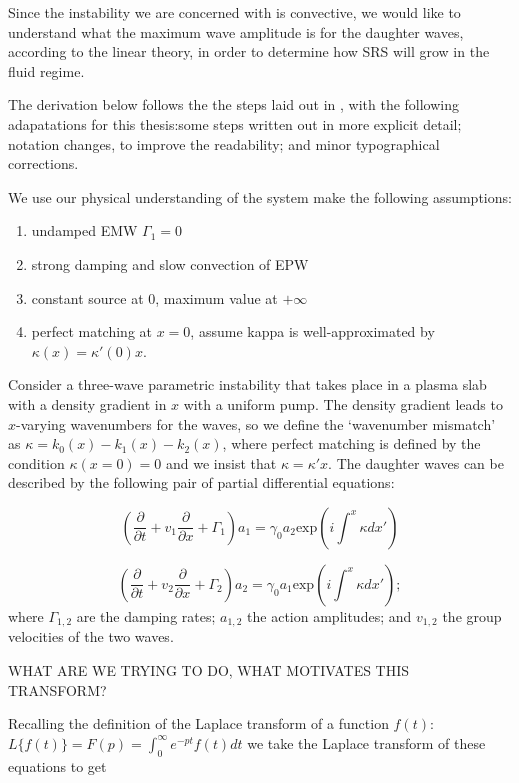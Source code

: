 Since the instability we are concerned with is convective, we would like to understand what the maximum wave amplitude is for the daughter waves, according to the linear theory, in order to determine how SRS will grow in the fluid regime.

The derivation below follows the the steps laid out in \citet{Nishikawa1976}, with the following adapatations for this thesis:some steps written out in more explicit detail; notation changes, to improve the readability; and minor typographical corrections. 

We use our physical understanding of the system make the following assumptions:
\begin{enumerate}
	\item undamped EMW $\Gamma_1 = 0$
	\item strong damping and slow convection of EPW
	\item constant source at 0, maximum value at $+\infty$
	\item perfect matching at $x=0$, assume kappa is well-approximated by 
	$\kappa(x) = \kappa'(0)x$.
\end{enumerate}

Consider a three-wave parametric instability that takes place in a plasma slab with a density gradient in $x$ with a uniform pump. The density gradient leads to $x$-varying wavenumbers for the waves, so we define the `wavenumber mismatch' as $\kappa = k_0(x) - k_1(x) - k_2(x)$, where perfect matching is defined by the condition $\kappa(x=0) = 0$ and we insist that $\kappa = \kappa' x$. The daughter waves can be described by the following pair of partial differential equations:

\begin{equation}
 \left(\frac{\partial}{\partial t} + v_1\frac{\partial}{\partial x} + \Gamma_1 \right)a_1 = \gamma_0a_2\text{exp}\left(i\int^x \kappa dx'\right)
\end{equation}

\begin{equation}
 \left(\frac{\partial}{\partial t} + v_2\frac{\partial}{\partial x} + \Gamma_2 \right)a_2 = \gamma_0a_1\text{exp}\left(i\int^x \kappa dx'\right);
\end{equation} 
where $\Gamma_{1,2}$ are the damping rates; $a_{1,2}$ the action amplitudes; and $v_{1,2}$ the group velocities of the two waves. 

WHAT ARE WE TRYING TO DO, WHAT MOTIVATES THIS TRANSFORM?

Recalling the definition of the Laplace transform of a function $f(t)$: $L\{f(t)\}= F(p) = \int_0^\infty e^{-pt} f(t) dt$ we take the Laplace transform of these equations to get

